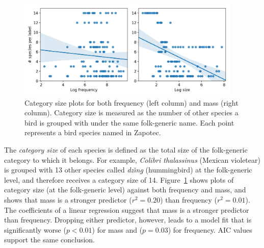 \documentclass[10pt,letterpaper]{article}
\begin{document}
\begin{figure}[!ht]
  \begin{center}
    \includegraphics[width=0.95\textwidth]{./figures/ssrr-singlespecies.png}
        \caption{Category size plots for both frequency (left column) and mass (right column). Category size is measured as the number of other species a bird is grouped with under the same folk-generic name. Each point represents a bird species named in Zapotec.}
        \label{fig-ssrr}
  \end{center}
\end{figure}

The \emph{category size} of each species is defined as the total size of the folk-generic category to which it belongs. For example, \emph{ Colibri thalassinus} (Mexican violetear) is grouped with 13 other species called \textit{dz\v{\i}n\b{g}} (hummingbird) at the folk-generic level, and therefore receives a category size of 14.  Figure~\ref{fig-ssrr} shows plots of category size (at the folk-generic level) against both frequency and mass, and shows that mass is a stronger predictor ($r^2 = 0.20$) than frequency ($r^2 = 0.01$). 
The coefficients of a linear regression suggest that mass is a stronger predictor than frequency. Dropping either predictor, however, leads to a model fit that is significantly worse ($p < 0.01$) for mass and ($p = 0.03$) for frequency. AIC values support the same conclusion.
\end{document}
